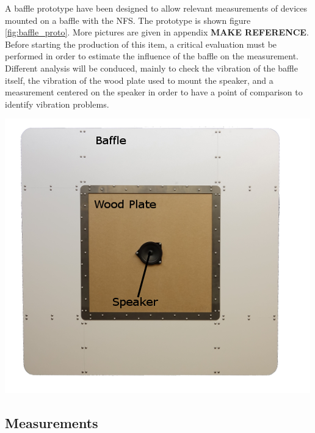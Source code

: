 \documentclass{report}
\begin{document}
\begin{minipage}{0.6\textwidth}
A baffle prototype have been designed to allow relevant measurements of devices mounted on a baffle with the NFS. The prototype is shown figure \ref{fig:baffle_proto}. More pictures are given in appendix \textbf{MAKE REFERENCE}. \\

Before starting the production of this item, a critical evaluation must be performed in order to estimate the influence of the baffle on the measurement. Different analysis will be conduced, mainly to check the vibration of the baffle itself, the vibration of the wood plate used to mount the speaker, and a measurement centered on the speaker in order to have a point of comparison to identify vibration problems.
\end{minipage}
\begin{minipage}{0.5\textwidth}
\begin{center}
	\includegraphics[scale=1.75]{GridOpti/Baffle_Alone_2} 
    \captionsetup{hypcap=false} 
	\label{fig:baffle_proto}
\end{center}
\end{minipage} 

\subsection{Measurements}
\end{document}
